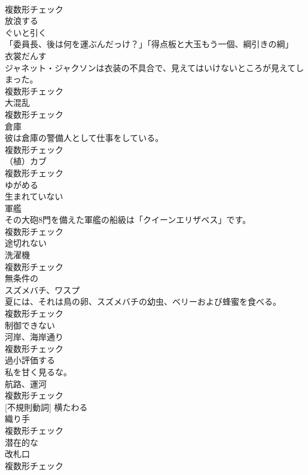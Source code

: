 \documentclass[8pt]{extreport}
\begin{document}
\begin{CJK}{UTF8}{min}
\\	複数形チェック
\\	[形容詞]	放浪する	
\\	[動詞]	ぐいと引く	
\\	「委員長、後は何を運ぶんだっけ？」「得点板と大玉もう一個、綱引きの綱」	
\\	[名詞]	衣裳だんす	
\\	ジャネット・ジャクソンは衣装の不具合で、見えてはいけないところが見えてしまった。	
\\	複数形チェック
\\	[名詞]	大混乱	
\\	複数形チェック
\\	[名詞]	倉庫	
\\	彼は倉庫の警備人として仕事をしている。	
\\	複数形チェック
\\	[名詞]	（植）カブ	
\\	複数形チェック
\\	[動詞]	ゆがめる	
\\	[形容詞]	生まれていない	
\\	[名詞]	軍艦	
\\	その大砲8門を備えた軍艦の船級は「クイーンエリザベス」です。	
\\	複数形チェック
\\	[形容詞]	途切れない	
\\	[名詞]	洗濯機	
\\	複数形チェック
\\	[形容詞]	無条件の	
\\	[名詞]	スズメバチ、ワスプ	
\\	夏には、それは鳥の卵、スズメバチの幼虫、ベリーおよび蜂蜜を食べる。	
\\	複数形チェック
\\	[形容詞]	制御できない	
\\	[名詞]	河岸、海岸通り	
\\	複数形チェック
\\	[動詞]	過小評価する	
\\	私を甘く見るな。	
\\	[名詞]	航路、運河	
\\	複数形チェック
\\	[動詞] [不規則動詞]	横たわる	
\\	[名詞]	織り手	
\\	複数形チェック
\\	[形容詞]	潜在的な	
\\	[名詞]	改札口	
\\	複数形チェック

\end{CJK}
\end{document}
